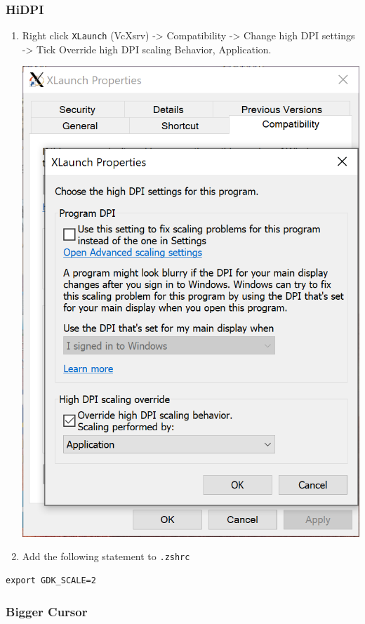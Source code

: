 \documentclass[10pt]{article}
\begin{document}
\subsubsection{HiDPI}
\label{sec:orgf395e73}
\begin{enumerate}
\item Right click \texttt{XLaunch} (VcXsrv) -> Compatibility -> Change high DPI settings -> Tick Override high DPI scaling Behavior, Application.
\begin{center}
\includegraphics[width=.9\linewidth]{vcxsrv-4.png}
\end{center}
\item Add the following statement to \texttt{.zshrc}
\end{enumerate}
\begin{verbatim}
export GDK_SCALE=2
\end{verbatim}

\subsubsection{Bigger Cursor}
\label{sec:org315c6fc}
\end{document}
